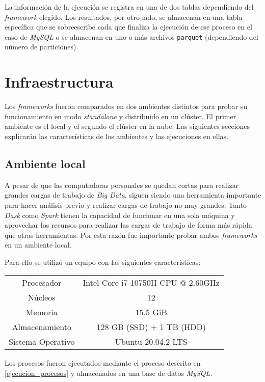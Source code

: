 La información de la ejecución se registra en una de dos tablas dependiendo del \textit{framework} elegido. Los resultados, por otro lado, se almacenan en una tabla específica que se sobreescribe cada que finaliza la ejecución de ese proceso en el caso de \textit{MySQL} o se almacenan en uno o más archivos \texttt{parquet} (dependiendo del número de particiones). 

\section{Infraestructura}

Los \textit{frameworks} fueron comparados en dos ambientes distintos para probar su funcionamiento en modo \textit{standalone} y distribuido en un clúster. El primer ambiente es el local y el segundo el clúster en la nube. Las siguientes secciones explicarán las características de los ambientes y las ejecuciones en ellas.

\subsection{Ambiente local}

A pesar de que las computadoras personales se quedan cortas para realizar grandes cargas de trabajo de \textit{Big Data}, siguen siendo una herramienta importante para hacer análisis previo y realizar cargas de trabajo no muy grandes. Tanto \textit{Dask} como \textit{Spark} tienen la capacidad de funcionar en una sola máquina y aprovechar los recursos para realizar las cargas de trabajo de forma más rápida que otras herramientas. Por esta razón fue importante probar ambos \textit{frameworks} en un ambiente local. 

Para ello se utilizó un equipo con las siguientes características:

\begin{center}
\begin{tabular}{|c|c|}
 \hline
  Procesador & Intel Core i7-10750H CPU @ 2.60GHz \\ 
  Núcleos & 12 \\
  Memoria & 15.5 GiB \\ 
  Almacenamiento & 128 GB (SSD) + 1 TB (HDD) \\ 
  Sistema Operativo & Ubuntu 20.04.2 LTS \\
  \hline
\end{tabular}
\end{center}

Los procesos fueron ejecutados mediante el proceso descrito en \ref{ejecucion_procesos} y almacenados en una base de datos \textit{MySQL}.

